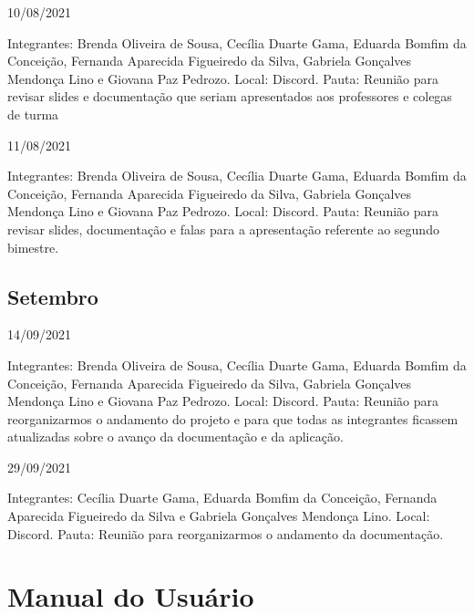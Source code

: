 \begin{apendicesenv}
\begin{flushleft}
10/08/2021 

Integrantes: Brenda Oliveira de Sousa, Cecília Duarte Gama, Eduarda Bomfim da Conceição, Fernanda Aparecida Figueiredo da Silva, Gabriela Gonçalves Mendonça Lino e Giovana Paz Pedrozo.
\newline
Local: \gls{Discord}.
\newline
Pauta: Reunião para revisar slides e documentação que seriam apresentados aos professores e colegas de turma

11/08/2021 

Integrantes: Brenda Oliveira de Sousa, Cecília Duarte Gama, Eduarda Bomfim da Conceição, Fernanda Aparecida Figueiredo da Silva, Gabriela Gonçalves Mendonça Lino e Giovana Paz Pedrozo.
\newline
Local: \gls{Discord}.
\newline
Pauta: Reunião para revisar slides, documentação e falas para a apresentação referente ao segundo bimestre.
\end{flushleft}

\begin{flushleft}
 \section{Setembro}
 14/09/2021 

Integrantes: Brenda Oliveira de Sousa, Cecília Duarte Gama, Eduarda Bomfim da Conceição, Fernanda Aparecida Figueiredo da Silva, Gabriela Gonçalves Mendonça Lino e Giovana Paz Pedrozo.
\newline
Local: \gls{Discord}.
\newline
Pauta: Reunião para reorganizarmos o andamento do projeto e para que todas as integrantes ficassem atualizadas sobre o avanço da documentação e da aplicação.

29/09/2021 

Integrantes: Cecília Duarte Gama, Eduarda Bomfim da Conceição, Fernanda Aparecida Figueiredo da Silva e Gabriela Gonçalves Mendonça Lino.
\newline
Local: \gls{Discord}.
\newline
Pauta: Reunião para reorganizarmos o andamento da documentação.
\end{flushleft}

\chapter{Manual do Usuário}
\label{manual-usuario}
\begin{flushleft}

\end{flushleft}
\end{apendicesenv}
